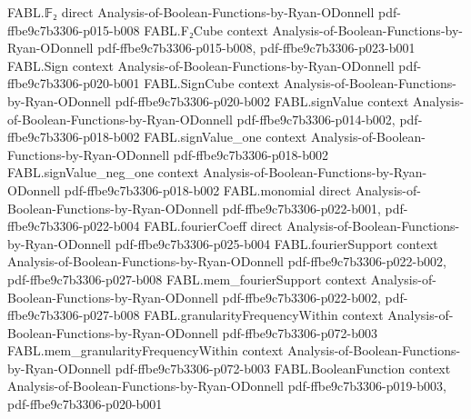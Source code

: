 \begin{theorem}
\label{FABL.undirectedCubeBoundaryFraction_eq_totalInfluence_div}
\leanok
{}
\proofstep
  {FABL.𝔽₂}
  {direct}
  {Analysis-of-Boolean-Functions-by-Ryan-ODonnell}
  {pdf-ffbe9c7b3306-p015-b008}
\proofstep
  {FABL.F₂Cube}
  {context}
  {Analysis-of-Boolean-Functions-by-Ryan-ODonnell}
  {pdf-ffbe9c7b3306-p015-b008,
    pdf-ffbe9c7b3306-p023-b001}
\proofstep
  {FABL.Sign}
  {context}
  {Analysis-of-Boolean-Functions-by-Ryan-ODonnell}
  {pdf-ffbe9c7b3306-p020-b001}
\proofstep
  {FABL.SignCube}
  {context}
  {Analysis-of-Boolean-Functions-by-Ryan-ODonnell}
  {pdf-ffbe9c7b3306-p020-b002}
\proofstep
  {FABL.signValue}
  {context}
  {Analysis-of-Boolean-Functions-by-Ryan-ODonnell}
  {pdf-ffbe9c7b3306-p014-b002,
    pdf-ffbe9c7b3306-p018-b002}
\proofstep
  {FABL.signValue_one}
  {context}
  {Analysis-of-Boolean-Functions-by-Ryan-ODonnell}
  {pdf-ffbe9c7b3306-p018-b002}
\proofstep
  {FABL.signValue_neg_one}
  {context}
  {Analysis-of-Boolean-Functions-by-Ryan-ODonnell}
  {pdf-ffbe9c7b3306-p018-b002}
\proofstep
  {FABL.monomial}
  {direct}
  {Analysis-of-Boolean-Functions-by-Ryan-ODonnell}
  {pdf-ffbe9c7b3306-p022-b001,
    pdf-ffbe9c7b3306-p022-b004}
\proofstep
  {FABL.fourierCoeff}
  {direct}
  {Analysis-of-Boolean-Functions-by-Ryan-ODonnell}
  {pdf-ffbe9c7b3306-p025-b004}
\proofstep
  {FABL.fourierSupport}
  {context}
  {Analysis-of-Boolean-Functions-by-Ryan-ODonnell}
  {pdf-ffbe9c7b3306-p022-b002,
    pdf-ffbe9c7b3306-p027-b008}
\proofstep
  {FABL.mem_fourierSupport}
  {context}
  {Analysis-of-Boolean-Functions-by-Ryan-ODonnell}
  {pdf-ffbe9c7b3306-p022-b002,
    pdf-ffbe9c7b3306-p027-b008}
\proofstep
  {FABL.granularityFrequencyWithin}
  {context}
  {Analysis-of-Boolean-Functions-by-Ryan-ODonnell}
  {pdf-ffbe9c7b3306-p072-b003}
\proofstep
  {FABL.mem_granularityFrequencyWithin}
  {context}
  {Analysis-of-Boolean-Functions-by-Ryan-ODonnell}
  {pdf-ffbe9c7b3306-p072-b003}
\proofstep
  {FABL.BooleanFunction}
  {context}
  {Analysis-of-Boolean-Functions-by-Ryan-ODonnell}
  {pdf-ffbe9c7b3306-p019-b003,
    pdf-ffbe9c7b3306-p020-b001}

\end{theorem}
